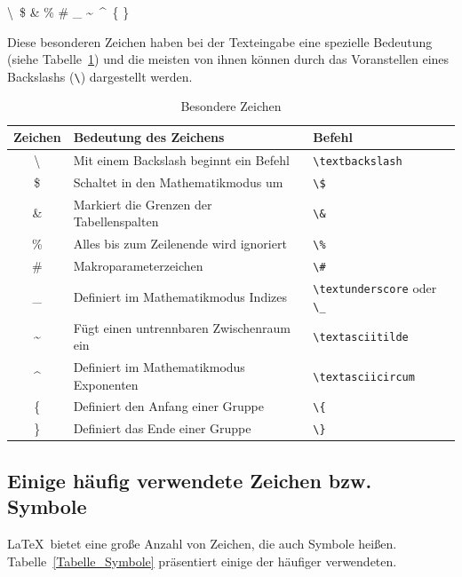 \begin{center}
\textbackslash\ \quad \$ \quad \& \quad \% \quad \# \quad \_  
\quad \textasciitilde\ \quad \textasciicircum\ \quad \{ \quad \}
\end{center}


Diese besonderen Zeichen haben bei der Texteingabe eine spezielle Bedeutung (siehe Tabelle~\ref{Tabelle_Sonderzeichen}) und die meisten von ihnen können durch das Voranstellen eines Backslashs (\verb!\!) dargestellt werden.

\begin{table}[h!tb]
\centering
\caption{Besondere Zeichen}
\label{Tabelle_Sonderzeichen}       %
\begin{tabular}{cp{6.7cm}p{4cm}}
\hline
Zeichen & Bedeutung des Zeichens & Befehl \\
\hline
\textbackslash & Mit einem Backslash beginnt ein Befehl  & \texttt{\textbackslash textbackslash} \\
\$ & Schaltet in den Mathematikmodus um & \texttt{\textbackslash \$} \\
\& & Markiert die Grenzen der Tabellenspalten & \texttt{\textbackslash \&} \\
\% & Alles bis zum Zeilenende wird ignoriert & \texttt{\textbackslash \%} \\
\# & Makroparameterzeichen & \texttt{\textbackslash \#} \\ 
\_ & Definiert im Mathematikmodus Indizes & \texttt{\textbackslash textunderscore} oder \texttt{\textbackslash \_} \\
\textasciitilde & Fügt einen untrennbaren Zwischenraum ein & \texttt{\textbackslash textasciitilde} \\
\textasciicircum & Definiert im Mathematikmodus Exponenten 
 & \texttt{\textbackslash textasciicircum} \\
\{ & Definiert den Anfang einer Gruppe & \texttt{\textbackslash\{} \\
\} & Definiert das Ende einer Gruppe &  \texttt{\textbackslash\}} \\
\hline
\end{tabular}
\end{table}



\subsection{Einige häufig verwendete Zeichen bzw. Symbole}

\LaTeX\ bietet eine große Anzahl von Zeichen, die auch Symbole heißen. Tabelle~\ref{Tabelle_Symbole} präsentiert einige der häufiger verwendeten.


